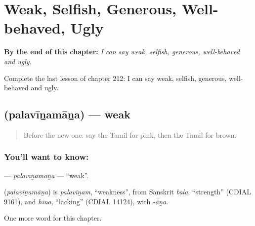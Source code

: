 
\chapter{Weak, Selfish, Generous, Well-behaved, Ugly}
\label{ch:ta-weak-selfish-generous-well-behaved-ugly}

\begin{chapteropening}
\textbf{By the end of this chapter:} \emph{I can say weak, selfish, generous, well-behaved and ugly.}

Complete the last lesson of chapter 212: I can say weak, selfish, generous, well-behaved and ugly.
\end{chapteropening}

\section[\texorpdfstring{\ta{பலவீனமான} (palavīṉamāṉa)}{பலவீனமான (palavīṉamāṉa)}]{ (palavīṉamāṉa) — weak}

\label{lesson:TA-C212-palavinamana}



\begin{quote}
Before the new one: say the Tamil for pink, then the Tamil for brown.
\end{quote}

\subsection*{You'll want to know: }
\textbf{} — \emph{palavīṉamāṉa} — \textquotedblleft{}weak\textquotedblright{}.

\begin{cousinweb}
\textbf{} (\emph{palavīṉamāṉa}) is \emph{palavīṉam}, \textquotedblleft{}weakness\textquotedblright{}, from Sanskrit \emph{bala}, \textquotedblleft{}strength\textquotedblright{} (CDIAL 9161), and \emph{hīna}, \textquotedblleft{}lacking\textquotedblright{} (CDIAL 14124), with \emph{-āṉa}.
\end{cousinweb}

\begin{grammarlens}[title={What you've built}]
One more word for this chapter.
\end{grammarlens}

